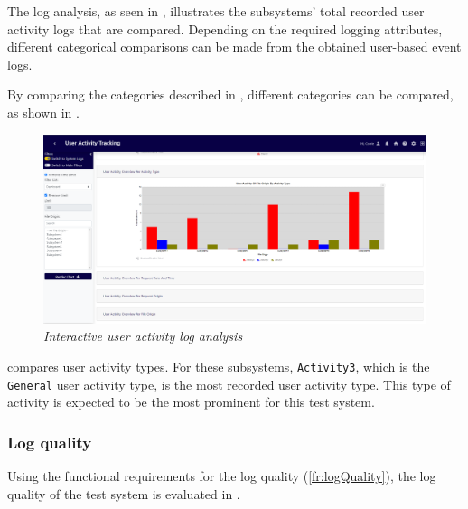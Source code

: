 \clearpage

The log analysis, as seen in , illustrates the subsystems' total recorded user activity logs that are compared. Depending on the required logging attributes, different categorical comparisons can be made from the obtained user-based event logs. \par By comparing the categories described in , different categories can be compared, as shown in . 

\begin{figure}[!htb]
	\centering %
	\includegraphics[width=0.99\linewidth]{img/ch3/analysis/UAT_menu_activities.png}
	\caption[Interactive user activity log analysis]
	{\textit{Interactive user activity log analysis}}\label{fig:ch3_UAT_menuActivities}
\end{figure}

 compares user activity types. For these subsystems, \texttt{Activity3}, which is the \texttt{General} user activity type, is the most recorded user activity type. This type of activity is expected to be the most prominent for this test system. 

\clearpage

\subsubsection{Log quality}
Using the functional requirements for the log quality (\ref{fr:logQuality}), the log quality of the test system is evaluated in .

